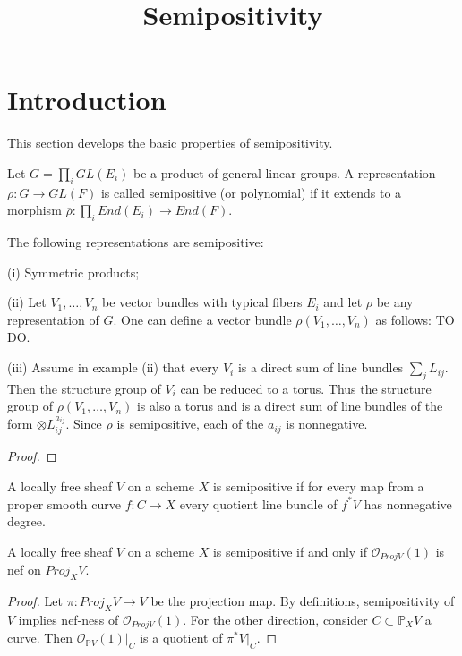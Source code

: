 


\newcommand{\todo}[1]{\footnote{\textbf{TODO.} #1}}


\title{Semipositivity}
\maketitle

\section{Introduction}
This section develops the basic properties of semipositivity.


\begin{definition}
Let $G=\prod_i GL(E_i)$ be a product of general linear groups. A representation $\rho:G\rightarrow GL(F)$ is called semipositive (or polynomial) if it extends to a morphism $\overline{\rho}:\prod_i End(E_i)\rightarrow End(F)$.
\end{definition}

\begin{lemma}
The following representations are semipositive:
\item[(i)] Symmetric products;
\item[(ii)] Let $V_1, \dots, V_n$ be vector bundles with typical fibers $E_i$ and let $\rho$ be any representation of $G$. One can define a vector bundle $\rho(V_1,\dots,V_n)$ as follows: TO DO.
\item[(iii)] Assume in example (ii) that every $V_i$ is a direct sum of line bundles $\sum_j L_{ij}$. Then the structure group of  $V_i$ can be reduced to a torus. Thus the structure group of $\rho(V_1,\dots, V_n)$ is also a torus and is a direct sum of line bundles of the form $\otimes L_{ij}^{a_{ij}}$. Since $\rho$ is semipositive, each of the $a_{ij}$ is nonnegative.
\end{lemma}


\begin{proof}

\end{proof}


\begin{definition}
A locally free sheaf $V$ on a scheme $X$ is semipositive if for every map from a proper smooth curve $f:C\to X$ every quotient line bundle of $f^*V$ has nonnegative degree.
\end{definition}

\begin{lemma}\label{semipos=nef}
A locally free sheaf $V$ on a scheme $X$ is semipositive if and only if $\mathcal{O}_{Proj V}(1)$ is nef on $Proj_XV$.
\end{lemma}
\begin{proof}
Let $\pi: Proj_X V\to V$ be the projection map. By definitions, semipositivity of $V$ implies nef-ness of $\mathcal{O}_{Proj V}(1)$. For the other direction, consider $C\subset \mathbb{P}_XV$ a curve. Then $\mathcal{O}_{\mathbb{P}V}(1)|_C$ is a quotient of $\pi^*V|_C$. 
\end{proof}

